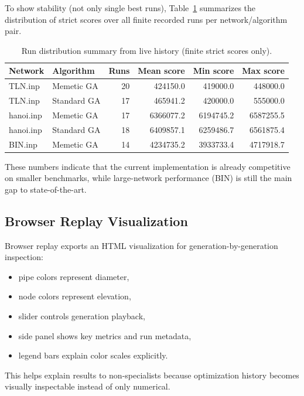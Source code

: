\documentclass[12pt, a4paper]{article}
\begin{document}
To show stability (not only single best runs), Table~\ref{tab:attempt005-run-distribution} summarizes the distribution of strict scores over all finite recorded runs per network/algorithm pair.

\begin{table}[H]
	\centering
	\caption{Run distribution summary from live history (finite strict scores only).}
	\label{tab:attempt005-run-distribution}
	\begin{tabular}{l l r r r r}
		\hline
		Network   & Algorithm   & Runs & Mean score & Min score & Max score \\
		\hline
		TLN.inp   & Memetic GA  & 20   & 424150.0   & 419000.0  & 448000.0  \\
		TLN.inp   & Standard GA & 17   & 465941.2   & 420000.0  & 555000.0  \\
		hanoi.inp & Memetic GA  & 17   & 6366077.2  & 6194745.2 & 6587255.5 \\
		hanoi.inp & Standard GA & 18   & 6409857.1  & 6259486.7 & 6561875.4 \\
		BIN.inp   & Memetic GA  & 14   & 4234735.2  & 3933733.4 & 4717918.7 \\
		\hline
	\end{tabular}
\end{table}

These numbers indicate that the current implementation is already competitive on smaller benchmarks, while large-network performance (BIN) is still the main gap to state-of-the-art.

\subsection{Browser Replay Visualization}

Browser replay exports an HTML visualization for generation-by-generation inspection:
\begin{itemize}
	\item pipe colors represent diameter,
	\item node colors represent elevation,
	\item slider controls generation playback,
	\item side panel shows key metrics and run metadata,
	\item legend bars explain color scales explicitly.
\end{itemize}

This helps explain results to non-specialists because optimization history becomes visually inspectable instead of only numerical.
\end{document}
